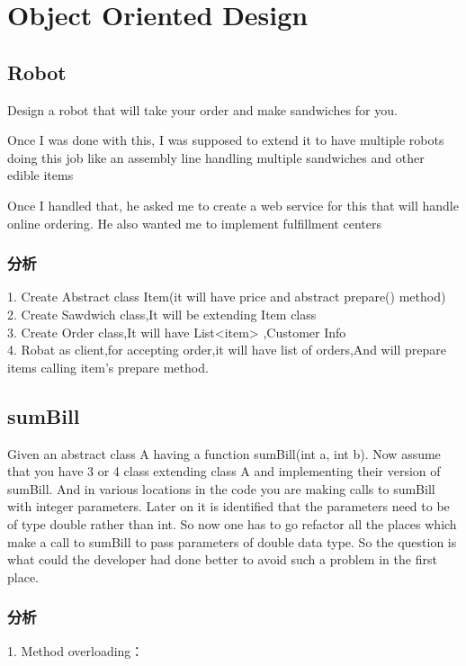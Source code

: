 \chapter{Object Oriented Design}

\section{Robot}
Design a robot that will take your order and make sandwiches for you. 

Once I was done with this, I was supposed to extend it to have multiple robots doing this job like an assembly line handling multiple sandwiches and other edible items 

Once I handled that, he asked me to create a web service for this that will handle online ordering. He also wanted me to implement fulfillment centers

\subsection{分析}
1. Create Abstract class Item(it will have price and abstract prepare() method) \\
2. Create Sawdwich class,It will be extending Item class \\
3. Create Order class,It will have List<item> ,Customer Info \\
4. Robat as client,for accepting order,it will have list of orders,And will prepare items calling item's prepare method.

\section{sumBill}
Given an abstract class A having a function sumBill(int a, int b). Now assume that you have 3 or 4 class extending class A and implementing their version of sumBill. And in 
various locations in the code you are making calls to sumBill with integer parameters. 
Later on it is identified that the parameters need to be of type double rather than int. So now one has to go refactor all the places which make a call to sumBill to pass 
parameters of double data type. 
So the question is what could the developer had done better to avoid such a problem in the first place. 

\subsection{分析}
1. Method overloading：

